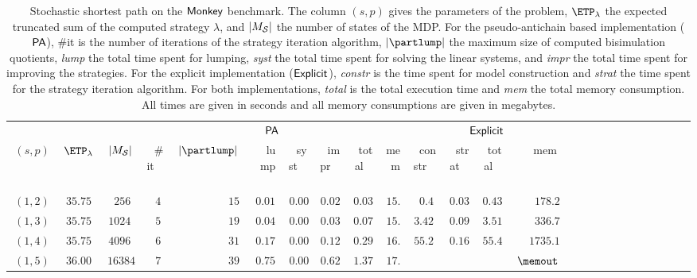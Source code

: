 \begin{table}[h!]
	\caption{Stochastic shortest path on the $\sf{Monkey}$ benchmark. The column $(s, p)$ gives the parameters of the problem, $\ETP_\lambda$ the expected truncated sum of the computed strategy $\lambda$, and $|M_{\cal S}|$ the number of states of the MDP.
For the pseudo-antichain based implementation ($\sf{PA}$), $\#$it is the number of iterations of the strategy iteration algorithm, $|\partlump|$ the maximum size of computed bisimulation quotients, \textit{lump} the total time spent for lumping, \textit{syst} the total time spent for solving the linear systems, and \textit{impr} the total time spent for improving the strategies. For the explicit implementation ($\sf{Explicit}$), \textit{constr} is the time spent for model construction and \textit{strat} the time spent for the strategy iteration algorithm. For both implementations, \textit{total} is the total execution time and \textit{mem} the total memory consumption. All times are given in seconds and all memory consumptions are given in megabytes.}
	\label{table:STRIPS1}
	\centering
		\scriptsize
 		\begin{tabular}{|r|r|r||r|r|r|r|r|r|r||r|r|r|r|r|r|r|r|r|r|r|r|r|r|r|}
		\hline
	  	& & & \multicolumn{7}{|c||}{{\small $\sf{PA}$}} & \multicolumn{4}{|c|}{{\small $\sf{Explicit}$}}\rule[-2pt]{0pt}{10pt}\\
		$\ (s, p) \ $ & $\ETP_\lambda$  & $|M_{\cal S}|$  & \ $\#$it \  & $\ |\partlump|\ $ & \ lump  \ &  \ syst \  &  \ impr  \ & \  total \  & mem & \ constr \  & \ strat \ & \ total \ & \ mem\ \rule[-3pt]{0pt}{10pt}\\
\hline\hline
$\ (1,2)\ $ & $\ 35.75\ $ & $\ 256\ $ & $\ 4\ $ & $\ 15\ $ & $\ 0.01\ $ & $\ 0.00\ $ & $\ 0.02\ $  & $\ 0.03\ $ & $\ 15.6\ $ & $\ 0.4\ $ & $\ 0.03\ $  & $\ 0.43\ $ & $\ 178.2\ $\rule[-3pt]{0pt}{10pt}\\
$\ (1,3)\ $ & $\ 35.75\ $ & $\ 1024\ $ & $\ 5\ $ & $\ 19\ $ & $\ 0.04\ $ & $\ 0.00\ $ & $\ 0.03\ $  & $\ 0.07\ $ & $\ 15.8\ $ & $\ 3.42\ $ & $\ 0.09\ $  & $\ 3.51\ $ & $\ 336.7\ $\rule[-3pt]{0pt}{10pt}\\
$\ (1,4)\ $ & $\ 35.75\ $ & $\ 4096\ $ & $\ 6\ $ & $\ 31\ $ & $\ 0.17\ $ & $\ 0.00\ $ & $\ 0.12\ $  & $\ 0.29\ $ & $\ 16.3\ $ & $\ 55.29\ $ & $\ 0.16\ $  & $\ 55.45\ $ & $\ 1735.1\ $\rule[-3pt]{0pt}{10pt}\\
$\ (1,5)\ $ & $\ 36.00\ $ & $\ 16384\ $ & $\ 7\ $ & $\ 39\ $ & $\ 0.75\ $ & $\ 0.00\ $ & $\ 0.62\ $  & $\ 1.37\ $ & $\ 17.1\ $ & $\ \ $ & $\ \ $  & $\ \ $ & $\ \memout\ $\rule[-3pt]{0pt}{10pt}\\

\end{tabular}
\end{table}
